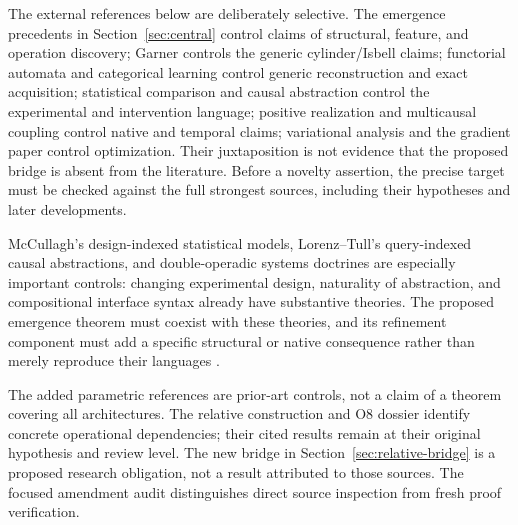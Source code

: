 \documentclass[11pt]{article}
\theoremstyle{remark}
\begin{document}
The external references below are deliberately selective. The emergence precedents in Section~\ref{sec:central} control claims of structural, feature, and operation discovery; Garner controls the generic cylinder/Isbell claims; functorial automata and categorical learning control generic reconstruction and exact acquisition; statistical comparison and causal abstraction control the experimental and intervention language; positive realization and multicausal coupling control native and temporal claims; variational analysis and the gradient paper control optimization. Their juxtaposition is not evidence that the proposed bridge is absent from the literature. Before a novelty assertion, the precise target must be checked against the full strongest sources, including their hypotheses and later developments.

McCullagh's design-indexed statistical models, Lorenz--Tull's query-indexed causal abstractions, and double-operadic systems doctrines are especially important controls: changing experimental design, naturality of abstraction, and compositional interface syntax already have substantive theories. The proposed emergence theorem must coexist with these theories, and its refinement component must add a specific structural or native consequence rather than merely reproduce their languages \cite{McCullagh,LorenzTull,SystemsDoctrines}.

The added parametric references are prior-art controls, not a claim of a theorem covering all architectures. The relative construction and O8 dossier identify concrete operational dependencies; their cited results remain at their original hypothesis and review level. The new bridge in Section~\ref{sec:relative-bridge} is a proposed research obligation, not a result attributed to those sources. The focused amendment audit distinguishes direct source inspection from fresh proof verification.
\end{document}
